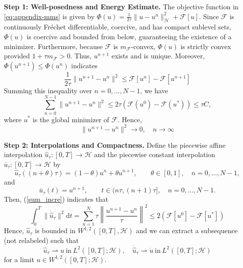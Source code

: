 \documentclass[10pt,a4paper]{amsart}
\newcommand{\calF}{\mathcal{F}}
\newcommand{\calH}{\mathcal{H}}
\newcommand{\dd}{\mathrm{d}}
\renewenvironment{proof}{\par\noindent{\bf Proof\ }}{\hfill\BlackBoxProof\par\medskip}
\begin{document}
\begin{proof} 

\noindent \textbf{Step 1: Well-posedness and Energy Estimate.} The objective function in \eqref{eq:appendix-mms} is given by $\Phi(u) = \frac{1}{2\tau}\|u-u^n\|_{\calH}^2+\calF[u]$. Since $\calF$ is continuously Fr\'echet differentiable, coercive, and has compact sublevel sets, $\Phi(u)$ is coercive and bounded from below, guaranteeing the existence of a minimizer. Furthermore, because $\calF$ is $m_{\calF}$-convex, $\Phi(u)$ is strictly convex provided $1 + \tau m_{\calF} > 0$. Thus, $u^{n+1}$ exists and is unique. Moreover, $\Phi(u^{n+1}) \le \Phi(u^n)$ indicates
\begin{equation}
 \frac{1}{2 \tau} \| u^{n+1} - u^n \|^2 \leq \mathcal{F}[u^{n}] - \mathcal{F}[u^{n+1}]
\end{equation}
Summing this inequality over $n=0, \dots, N-1$, we have
\begin{equation}\label{sum_incre}
 \sum_{n=0}^{N-1}\| u^{n+1} - u^n \|^2 \leq 2 \tau (\mathcal{F}(u^0) - \mathcal{F}(u^*) ) \leq \tau C  ,
\end{equation}
where $u^*$ is the global minimizer of $\mathcal{F}$. Hence,
\begin{equation}
  \| u^{n+1} - u^n \|^2 \rightarrow 0, \quad n \rightarrow \infty
\end{equation}


\noindent \textbf{Step 2: Interpolations and Compactness.} Define the piecewise affine interpolation $\hat u_\tau:[0,T]\to\mathcal H$ and the piecewise constant interpolation $\bar u_\tau:[0,T]\to\mathcal H$ by
\[
\hat u_\tau((n+\theta)\tau)
=(1-\theta)u^n+\theta u^{n+1},
\qquad \theta\in[0,1],\quad n=0,\dots,N-1,
\]
and
\[
\bar u_\tau(t)=u^{n+1},
\qquad t\in(n\tau,(n+1)\tau],\quad n=0,\dots,N-1.
\]
Then, (\ref{sum_incre}) indicates that
\begin{equation}
\int_{0}^T  \| \dot{\hat{u}}_{\tau} \|^2 \dd t = \sum_{n=1}^N \tau \left \| \frac{u^{n+1} - u^n}{\tau} \right \|^2 \leq 2 (\calF[u^0] - \calF[u^*])
\end{equation}
Hence, $\hat{u}_{\tau}$ is bounded in $W^{1, 2} ([0, T], \calH)$ and we can extract a subsequence (not relabeled) such that
\begin{equation}
\hat{u}_{\tau} \rightharpoonup u ~\text{in}~ L^2([0, T]; \calH), \quad \dot{\hat{u}}_{\tau} \rightharpoonup \dot{u} ~\text{in}~ L^2([0, T]; \calH)
\end{equation}
for a limit $u \in W^{1, 2} ([0, T]; \calH)$.


\end{proof}
\end{document}
